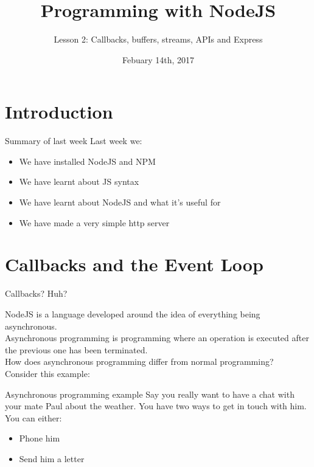 \documentclass{beamer}
\title{Programming with NodeJS}
\subtitle{Lesson 2: Callbacks, buffers, streams, APIs and Express}
\date{Febuary 14th, 2017}
\begin{document}
\begin{frame}
  \titlepage
\end{frame}


\section{Introduction}

\begin{frame}{Summary of last week}
  Last week we:
  \pause
  \begin{itemize}
  \item We have installed NodeJS and NPM\pause
  \item We have learnt about JS syntax\pause
  \item We have learnt about NodeJS and what it's useful for\pause
  \item We have made a very simple http server
  \end{itemize}
\end{frame}

\section{Callbacks and the Event Loop}

\begin{frame}{Callbacks? Huh?}

NodeJS is a language developed around the idea of everything being asynchronous. \\
\pause
Asynchronous programming is programming where an operation is executed after the previous one has been terminated.\\
\pause
How does asynchronous programming differ from normal programming?\\ 
\pause
Consider this example:


\end{frame}

\begin{frame}{Asynchronous programming example}
Say you really want to have a chat with your mate Paul about the weather. You have two ways to get in touch with him.
You can either: \pause
\begin{itemize}
  \item Phone him\pause
  \item Send him a letter
\end{itemize}

\end{frame}
\end{document}
